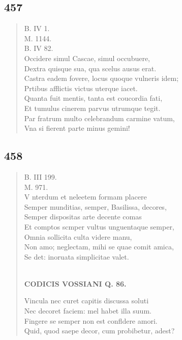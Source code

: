 \documentclass[11pt, a4paper]{report}
\begin{document}
            \subsection*{457}
      \begin{verse}
      B. IV 1. \\ M. 1144. \\ B. IV 82. \\ Occidere simul Cascae, simul occubuere, \\ Dextra quisque sua, qua scelus ausus erat. \\ Castra eadem fovere, locus quoque vulneris idem; \\ Prtibus afflictis victus uterque iacet. \\ Quanta fuit mentis, tanta est coucordia fati, \\ Et tumulus cinerem parvus utrumque tegit. \\ Par fratrum multo celebrandum carmine vatum, \\ Vna si fierent parte minus gemini! \\ 
      \end{verse}
  
            \subsection*{458}
      \begin{verse}
      B. III 199. \\ M. 971. \\ V nterdum et neleetem formam placere \\ Semper munditias, semper, Basilissa, decores, \\ Semper dispositas arte decente comas \\ Et comptos scmper vultus unguentaque semper, \\ Omnia sollicita culta videre manu, \\ Non amo; neglectam, mihi se quae comit amica, \\ Se det: inoruata simplicitae valet. \\ 
        ﻿\pagebreak 
     \marginpar{[339]} \begin{center} \textbf{CODICIS VOSSIANI Q. 86.} \end{center}Vincula nec curet capitis discussa soluti \\ Nec decoret faciem: mel habet illa suum. \\ Fingere se semper non est confldere amori. \\ Quid, quod saepe decor, cum probibetur, adest? \\ 
      \end{verse}
  
\end{document}

